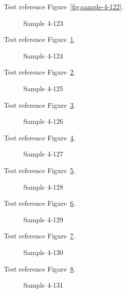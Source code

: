Test reference Figure~\ref{fig:sample-4-122}.

\begin{figure}[tbhp]
\caption{Sample 4-123}
\label{fig:sample-4-123}
\end{figure}

Test reference Figure~\ref{fig:sample-4-123}.

\begin{figure}[tbhp]
\caption{Sample 4-124}
\label{fig:sample-4-124}
\end{figure}

Test reference Figure~\ref{fig:sample-4-124}.

\begin{figure}[tbhp]
\caption{Sample 4-125}
\label{fig:sample-4-125}
\end{figure}

Test reference Figure~\ref{fig:sample-4-125}.

\begin{figure}[tbhp]
\caption{Sample 4-126}
\label{fig:sample-4-126}
\end{figure}

Test reference Figure~\ref{fig:sample-4-126}.

\begin{figure}[tbhp]
\caption{Sample 4-127}
\label{fig:sample-4-127}
\end{figure}

Test reference Figure~\ref{fig:sample-4-127}.

\begin{figure}[tbhp]
\caption{Sample 4-128}
\label{fig:sample-4-128}
\end{figure}

Test reference Figure~\ref{fig:sample-4-128}.

\begin{figure}[tbhp]
\caption{Sample 4-129}
\label{fig:sample-4-129}
\end{figure}

Test reference Figure~\ref{fig:sample-4-129}.

\begin{figure}[tbhp]
\caption{Sample 4-130}
\label{fig:sample-4-130}
\end{figure}

Test reference Figure~\ref{fig:sample-4-130}.

\begin{figure}[tbhp]
\caption{Sample 4-131}
\label{fig:sample-4-131}
\end{figure}

